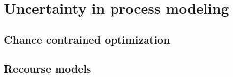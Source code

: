 \chapter{Uncertainty in process modeling}
\label{chp:uncertainty}

\section{Chance contrained optimization}

\section{Recourse models}


